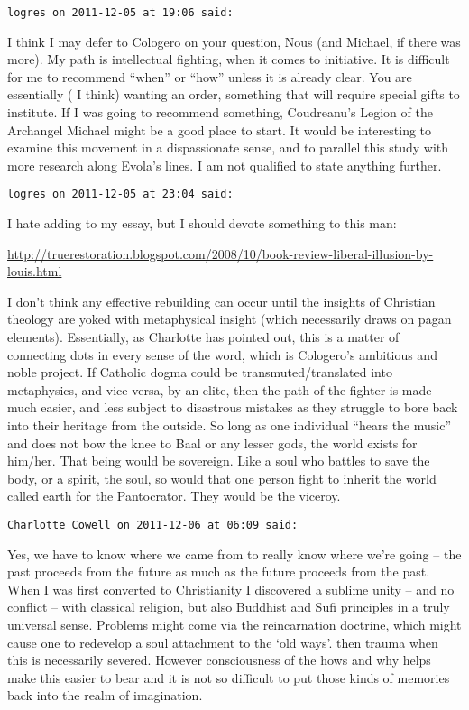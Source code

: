 \begin{footnotesize}
\begin{sffamily}
\hfill

\texttt{logres on 2011-12-05 at 19:06 said: }

I think I may defer to Cologero on your question, Nous (and Michael, if there was more). My path is intellectual fighting, when it comes to initiative. It is difficult for me to recommend ``when'' or ``how'' unless it is already clear. You are essentially ( I think) wanting an order, something that will require special gifts to institute. If I was going to recommend something, Coudreanu's Legion of the Archangel Michael might be a good place to start. It would be interesting to examine this movement in a dispassionate sense, and to parallel this study with more research along Evola's lines. I am not qualified to state anything further.


\hfill

\texttt{logres on 2011-12-05 at 23:04 said: }

I hate adding to my essay, but I should devote something to this man:

\url{http://truerestoration.blogspot.com/2008/10/book-review-liberal-illusion-by-louis.html}

I don't think any effective rebuilding can occur until the insights of Christian theology are yoked with metaphysical insight (which necessarily draws on pagan elements). Essentially, as Charlotte has pointed out, this is a matter of connecting dots in every sense of the word, which is Cologero's ambitious and noble project. If Catholic dogma could be transmuted/translated into metaphysics, and vice versa, by an elite, then the path of the fighter is made much easier, and less subject to disastrous mistakes as they struggle to bore back into their heritage from the outside. So long as one individual ``hears the music'' and does not bow the knee to Baal or any lesser gods, the world exists for him/her. That being would be sovereign. Like a soul who battles to save the body, or a spirit, the soul, so would that one person fight to inherit the world called earth for the Pantocrator. They would be the viceroy.


\hfill

\texttt{Charlotte Cowell on 2011-12-06 at 06:09 said: }

Yes, we have to know where we came from to really know where we're going – the past proceeds from the future as much as the future proceeds from the past. When I was first converted to Christianity I discovered a sublime unity – and no conflict – with classical religion, but also Buddhist and Sufi principles in a truly universal sense. Problems might come via the reincarnation doctrine, which might cause one to redevelop a soul attachment to the `old ways'. then trauma when this is necessarily severed. However consciousness of the hows and why helps make this easier to bear and it is not so difficult to put those kinds of memories back into the realm of imagination.



\end{sffamily}
\end{footnotesize}
